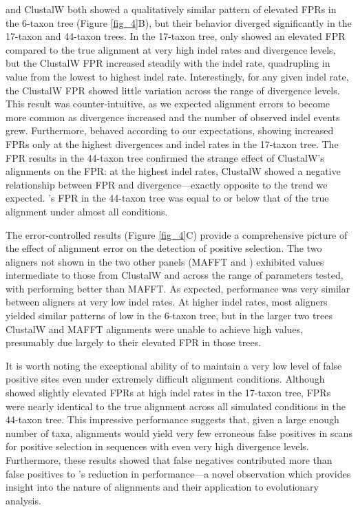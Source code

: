 \documentclass{article}
\begin{document}
\prankc{} and ClustalW both showed a qualitatively similar pattern of
elevated FPRs in the 6-taxon tree (Figure \ref{fig_4}B), but their
behavior diverged significantly in the 17-taxon and 44-taxon trees. In
the 17-taxon tree, \prankc{} only showed an elevated FPR compared to
the true alignment at very high indel rates and divergence levels, but
the ClustalW FPR increased steadily with the indel rate, quadrupling
in value from the lowest to highest indel rate. Interestingly, for any
given indel rate, the ClustalW FPR showed little variation across the
range of divergence levels. This result was counter-intuitive, as we
expected alignment errors to become more common as divergence
increased and the number of observed indel events grew. Furthermore,
\prankc{} behaved according to our expectations, showing increased
FPRs only at the highest divergences and indel rates in the 17-taxon
tree. The FPR results in the 44-taxon tree confirmed the strange
effect of ClustalW's alignments on the \sw FPR: at the highest indel
rates, ClustalW showed a negative relationship between FPR and
divergence---exactly opposite to the trend we expected. \prankc{}'s
FPR in the 44-taxon tree was equal to or below that of the true
alignment under almost all conditions.

The error-controlled \tpr results (Figure \ref{fig_4}C) provide a
comprehensive picture of the effect of alignment error on the detection of
\sw positive selection. The two aligners not shown in the two other
panels (MAFFT and \pranka) exhibited \tpr values intermediate to those
from ClustalW and \prankc across the range of parameters tested, with \pranka performing
better than MAFFT. As
expected, performance was very similar between aligners at very low
indel rates. At higher indel rates, most aligners yielded similar
patterns of low \tpr in the 6-taxon tree, but in the larger two trees
ClustalW and MAFFT alignments were unable to achieve high \tpr
values, presumably due largely to their elevated FPR in those trees.

It is worth noting the exceptional ability of \prankc to maintain a
very low level of false positive sites even under extremely difficult
alignment conditions. Although \prankc showed slightly elevated FPRs
at high indel rates in the 17-taxon tree, FPRs were nearly identical
to the true alignment across all simulated conditions in the 44-taxon
tree. This impressive performance suggests that, given a large enough
number of taxa, \prankc alignments would yield very few erroneous
false positives in scans for positive selection in sequences with even very
high divergence levels. Furthermore, these results showed that false
negatives contributed more than false positives to \prankc{}'s
reduction in \sw performance---a novel observation which provides
insight into the nature of \prankc alignments and their application to
\sw evolutionary analysis.
\end{document}

